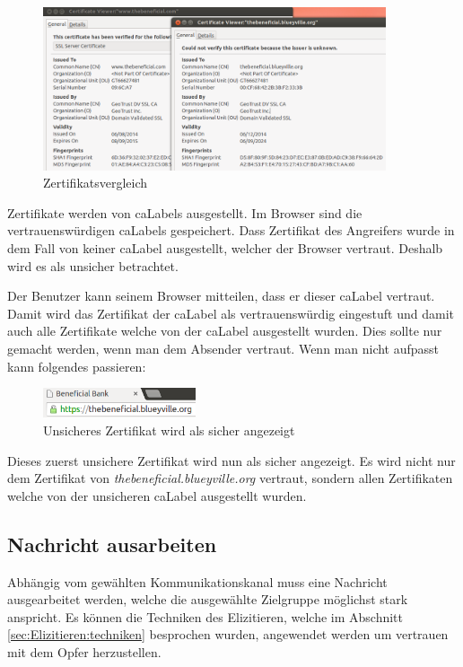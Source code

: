 \begin{figure}[H]
  \centering
  \includegraphics[width=0.9\textwidth]{images/https-certificate-comparision.png}
  \caption{Zertifikatsvergleich}
  \label{fig:phishing:angriffvorbereiten:angriffsvektoren:fakecertificates:certificatecomparison}
\end{figure}

Zertifikate werden von \Glspl{caLabel} ausgestellt. Im Browser sind die vertrauenswürdigen \Glspl{caLabel} gespeichert. Dass Zertifikat des Angreifers wurde in dem Fall von keiner \Gls{caLabel} ausgestellt, welcher der Browser vertraut. Deshalb wird es als unsicher betrachtet.

Der Benutzer kann seinem Browser mitteilen, dass er dieser \Gls{caLabel} vertraut. Damit wird das Zertifikat der \Gls{caLabel} als vertrauenswürdig eingestuft und damit auch alle Zertifikate welche von der \Gls{caLabel} ausgestellt wurden. Dies sollte nur gemacht werden, wenn man dem Absender vertraut. Wenn man nicht aufpasst kann folgendes passieren:

\begin{figure}[H]
  \centering
  \includegraphics[width=0.4\textwidth]{images/https-chrome-falsesecure.png}
  \caption{Unsicheres Zertifikat wird als sicher angezeigt}
  \label{fig:phishing:angriffvorbereiten:angriffsvektoren:fakecertificates:chrome:falsesecure}
\end{figure}
Dieses zuerst unsichere Zertifikat wird nun als sicher angezeigt. Es wird nicht nur dem Zertifikat von \textit{thebeneficial.blueyville.org} vertraut, sondern allen Zertifikaten welche von der unsicheren \Gls{caLabel} ausgestellt wurden.

\subsection{Nachricht ausarbeiten}
Abhängig vom gewählten Kommunikationskanal muss eine Nachricht ausgearbeitet werden, welche die ausgewählte Zielgruppe möglichst stark anspricht.
Es können die Techniken des Elizitieren, welche im Abschnitt \ref{sec:Elizitieren:techniken} besprochen wurden, angewendet werden um vertrauen mit dem Opfer herzustellen.

